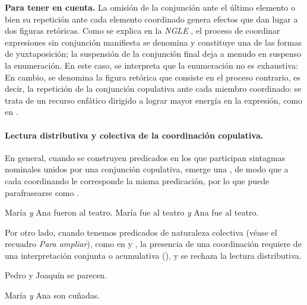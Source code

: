 \begin{destacado}
\textbf{Para tener en cuenta.} La omisión de la conjunción ante el último
elemento o bien su repetición ante cada elemento coordinado genera efectos que
dan lugar a dos figuras retóricas. Como se explica en la \textit{NGLE}
\parencite[§\,31.2b]{rae2025}, el proceso de coordinar expresiones sin
conjunción manifiesta se denomina  y constituye una de las
formas de yuxtaposición; la suspensión de la conjunción final deja a menudo en
suspenso la enumeración. En este caso, se interpreta que la enumeración no es
exhaustiva:  En
cambio, se denomina  la figura retórica que consiste en el
proceso contrario, es decir, la repetición de la conjunción copulativa ante cada
miembro coordinado: se trata de un recurso enfático dirigido a lograr mayor
energía en la expresión, como en  \parencite[§\,31.2c]{rae2025}.
\end{destacado}

\paragraph{Lectura distributiva y colectiva de la coordinación copulativa.}\label{sec:12-distributiva}
En general, cuando se construyen predicados en los que participan sintagmas
nominales unidos por una conjunción copulativa, emerge una , de modo que a cada coordinando le corresponde la misma
predicación, por lo que  puede parafrasearse como
.

\begin{exe}
  \ex
    \begin{xlist}
      \ex\label{ex:12-teatro-a} María \textit{y} Ana fueron al teatro.
      \ex\label{ex:12-teatro-b} María fue al teatro \textit{y} Ana fue al
          teatro.
    \end{xlist}
\end{exe}

Por otro lado, cuando tenemos predicados de naturaleza colectiva (véase el
recuadro \textit{Para ampliar}), como en  y
, la presencia de una coordinación requiere de una
interpretación conjunta o acumulativa (), y se rechaza
la lectura distributiva.

\begin{exe}
  \ex\label{ex:12-parecen}
    \begin{xlist}
      \ex Pedro y Joaquín se parecen.
    \end{xlist}
  \ex\label{ex:12-cunadas}
    \begin{xlist}
      \ex María \textit{y} Ana son cuñadas.
    \end{xlist}
\end{exe}

